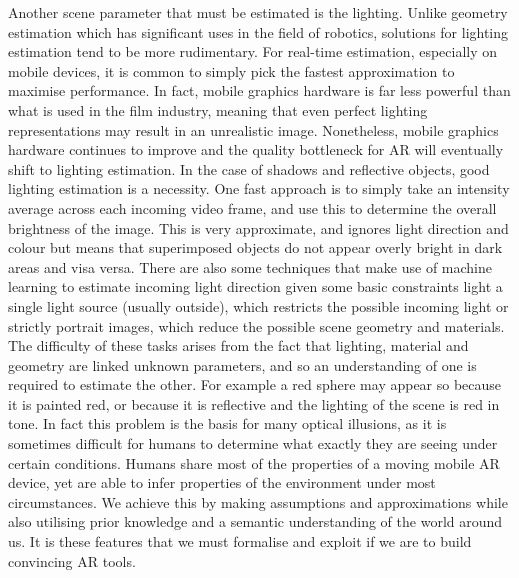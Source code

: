 \documentclass[ %
                    author={Gavin Parker},
                supervisor={Dr. Neill Campbell},
                    degree={MEng},
                     title={Deep Siamese Networks for Illumination Estimation from Stereo Images},
                  subtitle={},
                      type={research},
                      year={2018} ]{dissertation}
\begin{document}
\newline
Another scene parameter that must be estimated is the lighting. Unlike geometry estimation which has significant uses in the field of robotics, solutions for lighting estimation tend to be more rudimentary. For real-time estimation, especially on mobile devices, it is common to simply pick the fastest approximation to maximise performance. In fact, mobile graphics hardware is far less powerful than what is used in the film industry, meaning that even perfect lighting representations may result in an unrealistic image. Nonetheless, mobile graphics hardware continues to improve and the quality bottleneck for AR will eventually shift to lighting estimation. In the case of shadows and reflective objects, good lighting estimation is a necessity. One fast approach is to simply take an intensity average across each incoming video frame, and use this to determine the overall brightness of the image. This is very approximate, and ignores light direction and colour but means that superimposed objects do not appear overly bright in dark areas and visa versa. There are also some techniques that make use of machine learning to estimate incoming light direction given some basic constraints light a single light source (usually outside), which restricts the possible incoming light or strictly portrait images, which reduce the possible scene geometry and materials.
\newline
The difficulty of these tasks arises from the fact that lighting, material and geometry are linked unknown parameters, and so an understanding of one is required to estimate the other. For example a red sphere may appear so because it is painted red, or because it is reflective and the lighting of the scene is red in tone. In fact this problem is the basis for many optical illusions, as it is sometimes difficult for humans to determine what exactly they are seeing under certain conditions. Humans share most of the properties of a moving mobile AR device, yet are able to infer properties of the environment under most circumstances. We achieve this by making assumptions and approximations while also utilising prior knowledge and a semantic understanding of the world around us. It is these features that we must formalise and exploit if we are to build convincing AR tools.
\newline
\end{document}
